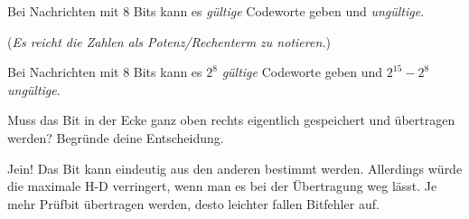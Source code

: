 \documentclass[10pt, a4paper]{scrartcl}
\begin{document}
\begin{aufgabe}
	Bei Nachrichten mit 8 Bits kann es \luecke{2cm} \emph{gültige} Codeworte geben und \luecke{2cm} \emph{ungültige}.
	
	(\emph{Es reicht die Zahlen als Potenz/Rechenterm zu notieren.})
\end{aufgabe}
\begin{loesung}
	Bei Nachrichten mit 8 Bits kann es \underline{$2^8$} \emph{gültige} Codeworte geben und \underline{$2^15 - 2^8$} \emph{ungültige}.
\end{loesung}

\begin{aufgabe}
	Muss das Bit in der Ecke ganz oben rechts eigentlich gespeichert und übertragen werden? Begründe deine Entscheidung.
\end{aufgabe}
\begin{loesung}
	Jein! Das Bit kann eindeutig aus den anderen bestimmt werden. Allerdings würde die maximale H-D verringert, wenn man es bei der Übertragung weg lässt. Je mehr Prüfbit übertragen werden, desto leichter fallen Bitfehler auf.
\end{loesung}
\end{document}
